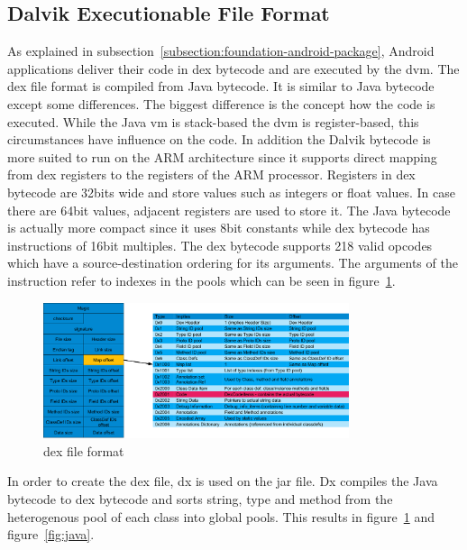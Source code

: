 \subsection{Dalvik Executionable File Format} \label{subsection:android-dex}
As explained in subsection~\ref{subsection:foundation-android-package}, Android applications deliver their code in \gls{dex} bytecode and are executed by the \gls{dvm}.
The dex file format is compiled from Java bytecode. It is similar to Java bytecode except some differences.
The biggest difference is the concept how the code is executed.
While the Java \gls{vm} is stack-based the \gls{dvm} is register-based, this circumstances have influence on the code.
In addition the Dalvik bytecode is more suited to run on the ARM architecture since it supports direct mapping from dex registers to the registers of the ARM processor.
Registers in \gls{dex} bytecode are 32bits wide and store values such as integers or float values.
In case there are 64bit values, adjacent registers are used to store it.
The Java bytecode is actually more compact since it uses 8bit constants while \gls{dex} bytecode has instructions of 16bit multiples.
The \gls{dex} bytecode supports 218 valid opcodes which have a source-destination ordering for its arguments.
The arguments of the instruction refer to indexes in the pools which can be seen in figure~\ref{fig:dex}.
\newline
\begin{figure}[h]
    \centering
    \includegraphics[width=0.8\textwidth]{data/dex.png}
    \caption{\gls{dex} file format \cite{andevconDalvikART}}
    \label{fig:dex}
\end{figure}

In order to create the dex file, dx is used on the \gls{jar} file.
Dx compiles the Java bytecode to \gls{dex} bytecode and sorts string, type and method from the heterogenous pool of each class into global pools.
This results in figure~\ref{fig:dex} and figure~\ref{fig:java}.


